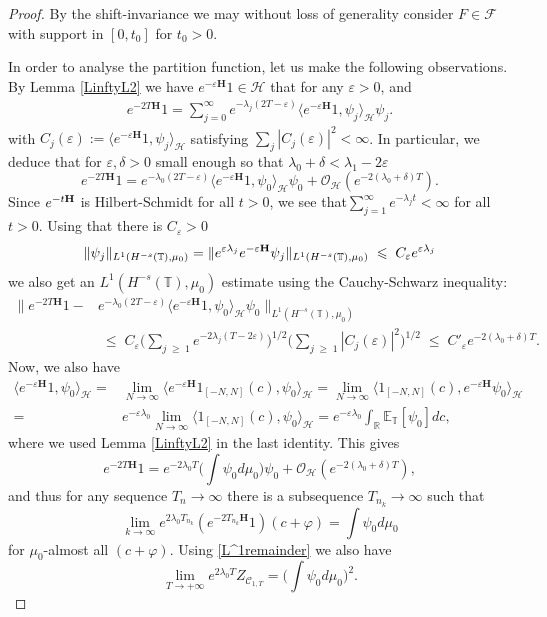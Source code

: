 \documentclass[11pt]{amsart}
\numberwithin{equation}{section}
\theoremstyle{definition}
\renewcommand{\leq}{\;\leqslant\;}                   %
\renewcommand{\geq}{\;\geqslant\;}                   %
\renewcommand{\H}{\mathbb{H}}
\newcommand{\R}{\mathbb{R}}
\def\H{\mathbf{H}}
\def\E{\mathbb{E}}
\newcommand{\mc}{\mathcal}
\newcommand{\la}{\lambda}
\def\eps{\varepsilon}
\def\T{\mathbb{T}}
\begin{document}
\begin{proof}
By the shift-invariance we may without loss of generality consider $F \in \mathcal{F}$ with support in $[0,t_0]$ for $t_0>0$. 

In order to analyse the partition function, let us make the following observations.
By Lemma \ref{LinftyL2} we have $e^{-\eps\H}1\in \mc{H}$ that for any $\eps >0$, and 
\begin{align*}
e^{-2T\H}1
=
\sum_{j=0}^\infty e^{-\lambda_j (2T-\eps)} \langle e^{-\eps\H}1,\psi_j \rangle_{\mc{H}} \psi_j.
\end{align*}
with $C_j(\eps):= \langle e^{-\eps\H}1,\psi_j \rangle_{\mc{H}}$ satisfying $\sum_j |C_j(\eps)|^2<\infty$.
In particular, we deduce that for $\eps,\delta>0$ small enough so that $\la_0+\delta<\la_1-2\eps$
\[ e^{-2T\H}1=e^{-\lambda_0 (2T-\eps)} \langle e^{-\eps\H}1,\psi_0 \rangle_{\mc{H}} \psi_0+ \mc{O}_{\mc{H}}(e^{-2(\la_0+\delta)T}).\]
Since $e^{-t{\bf H}}$ is Hilbert-Schmidt for all $t>0$, we see that$\sum_{j=1}^\infty e^{-\la_jt}<\infty$ for all $t>0$.
Using  that there is $C_\eps>0$
\[\|\psi_j\|_{L^1(H^{-s}(\T),\mu_0)}=\|e^{\eps \la_j}e^{-\eps{\bf H}}\psi_j \|_{L^1(H^{-s}(\T),\mu_0)}\leq C_\eps e^{\eps \la_j} \]
we also get an $L^1(H^{-s}(\T),\mu_0)$ estimate using the Cauchy-Schwarz inequality:
\begin{equation}\label{L^1remainder}
\begin{split} 
\|e^{-2T\H}1-&e^{-\lambda_0 (2T-\eps)} \langle e^{-\eps\H}1,\psi_0 \rangle_{\mc{H}} \psi_0\|_{L^1(H^{-s}(\T),\mu_0)}
\\ &\leq  C_\eps \Big(\sum_{j\geq 1}e^{-2\la_j(T-2\eps)}\Big)^{1/2}\Big(\sum_{j\geq 1} |C_j(\eps)|^2\Big)^{1/2}
\leq  C'_\eps e^{-2(\la_0+\delta)T}.
\end{split}
\end{equation}
Now, we also have 
\[\begin{split}
\langle e^{-\eps\H}1,\psi_0 \rangle_{\mc{H}}=&\lim_{N\to \infty}\langle e^{-\eps\H}1_{[-N,N]}(c),
\psi_0 \rangle_{\mc{H}}
= \lim_{N\to \infty}\langle 1_{[-N,N]}(c),
e^{-\eps\H}\psi_0 \rangle_{\mc{H}}\\
 =& e^{-\eps \la_0}\lim_{N\to \infty}\langle 1_{[-N,N]}(c),
\psi_0 \rangle_{\mc{H}}=e^{-\eps \la_0}\int_\R \E_{\mathbb T}[\psi_0] dc,
\end{split}\]
where we used Lemma \ref{LinftyL2} in the last identity. 
This gives 
\[e^{-2T\H}1=e^{-2\lambda_0 T}\Big(\int \psi_0 d\mu_0\Big) \psi_0 +\mc{O}_{\mc{H}}(e^{-2(\la_0+\delta)T}),\]
and thus for any sequence $T_n\to \infty$ there is a subsequence $T_{n_k}\to \infty$ such that
\[\lim_{k\to \infty }e^{2\lambda_0T_{n_k}}(e^{-2T_{n_k}\H}1)(c+\varphi)= \int \psi_0 d\mu_0\] 
for $\mu_0$-almost all $(c+\varphi)$. Using \eqref{L^1remainder} we also have 
\[ \lim_{T\to +\infty}e^{2\lambda_0 T}Z_{\mc{C}_{1,T}}= \Big(\int \psi_0 d\mu_0\Big)^2. \]


\end{proof}
\end{document}

